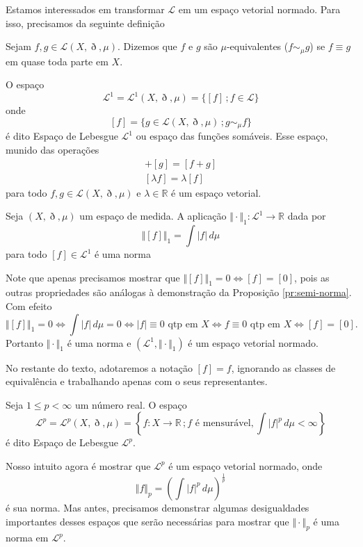 \documentclass[a4paper, 11pt]{book}
\theoremstyle{definition}
\newcommand{\bR}{\mathbb{R}}
\newcommand{\cL}{\mathcal{L}}
\begin{document}
Estamos interessados em transformar $\cL$ em um espaço vetorial normado.
Para isso, precisamos da seguinte definição
\begin{dbox}
    Sejam $f,g \in \cL(X,\eth,\mu)$. Dizemos que $f$ e $g$ são $\mu$-equivalentes ($f \sim_\mu g$) se $f \equiv g$ em quase toda parte em $X$.
\end{dbox}
O espaço
\[
    \cL^1 = \cL^1(X,\eth,\mu) =\{[f] \,; f \in \cL\}
\]
onde
\[
    [f] = \{g \in \cL(X,\eth,\mu) \,; g \sim_\mu f\}
\]
é dito Espaço de Lebesgue $\cL^1$ ou espaço das funções somáveis.
Esse espaço, munido das operações
\begin{gather*}
    [f] + [g] = [f + g]\\
    [\lambda f] = \lambda [f]
\end{gather*}
para todo $f, g \in \cL(X,\eth,\mu)$ e $\lambda \in \bR$ é um espaço vetorial.

\begin{pbox}
    Seja $(X,\eth,\mu)$ um espaço de medida.
    A aplicação $\Vert \cdot \Vert_1 : \cL^1 \to \bR$ dada por
    \[
        \Vert [f] \Vert_1 = \int |f| \,d\mu
    \]
    para todo $[f] \in \cL^1$ é uma norma
\end{pbox}
\begin{prf}
    Note que apenas precisamos mostrar que $\Vert [f] \Vert_1 = 0 \iff [f] = [0]$, pois as outras propriedades são análogas à demonstração da Proposição \ref{pr:semi-norma}.
    Com efeito
    \[
        \Vert [f] \Vert_1 = 0 \iff \int |f| \,d\mu = 0 \iff |f| \equiv 0 \text{ qtp em } X \iff f \equiv 0 \text{ qtp em } X \iff [f] = [0].
    \]
    Portanto $\Vert \cdot \Vert_1$ é uma norma e $(\cL^1,\Vert \cdot \Vert_1)$ é um espaço vetorial normado.
\end{prf}

No restante do texto, adotaremos a notação $[f] = f$, ignorando as classes de equivalência e trabalhando apenas com o seus representantes.

\begin{dbox}
    Seja $1 \leqslant p < \infty$ um número real.
    O espaço
    \[
        \cL^p = \cL^p(X,\eth,\mu) = \left\{ f : X \to \bR \,; f \text{ é mensurável}, \int|f|^p \, d\mu < \infty \right\}
    \]
    é dito Espaço de Lebesgue $\cL^p$.
\end{dbox}
Nosso intuito agora é mostrar que $\cL^p$ é um espaço vetorial normado, onde
\[
    \Vert f \Vert_p = \left( \int |f|^p \,d\mu \right)^{\frac{1}{p}}
\]
é sua norma.
Mas antes, precisamos demonstrar algumas desigualdades importantes desses espaços que serão necessárias para mostrar que $\Vert \cdot \Vert_p$ é uma norma em $\cL^p$.
\end{document}
